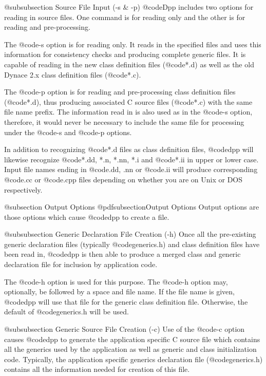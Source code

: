 @subsubsection Source File Input (-s & -p)
@code{Dpp} includes two options for reading in source files.  One
command is for reading only and the other is for reading and
pre-processing.

The @code{-s} option is for reading only.  It reads in the specified
files and uses this information for consistency checks and producing
complete generic files.  It is capable of reading in the new
class definition files (@code{*.d}) as well as the old Dynace 2.x
class definition files (@code{*.c}).

The @code{-p} option is for reading and pre-processing class
definition files (@code{*.d}), thus producing associated
C source files (@code{*.c}) with the same file name prefix.
The information read in is also used as in the @code{-s} option,
therefore, it would never be necessary to include the same
file for processing under the @code{-s} and @code{-p} options.

In addition to recognizing @code{*.d} files as class definition files,
@code{dpp} will likewise recognize @code{*.dd, *.n, *.nn, *.i} and
@code{*.ii} in upper or lower case.  Input file names ending in
@code{.dd, .nn} or @code{.ii} will produce corresponding @code{.cc} or
@code{.cpp} files depending on whether you are on Unix or DOS
respectively.

@subsection Output Options
@pdfsubsection{Output Options}
Output options are those options which cause @code{dpp} to create
a file.

@subsubsection Generic Declaration File Creation (-h)
Once all the pre-existing generic declaration files (typically
@code{generics.h}) and class definition files have been read in,
@code{dpp} is then able to produce a merged class and generic
declaration file for inclusion by application code.

The @code{-h} option is used for this purpose.  The @code{-h} option
may, optionally, be followed by a space and file name.  If the file name
is given, @code{dpp} will use that file for the generic class definition
file.  Otherwise, the default of @code{generics.h} will be used.

@subsubsection Generic Source File Creation (-c)
Use of the @code{-c} option causes @code{dpp} to generate the
application specific C source file which contains all the
generics used by the application as well as generic and class
initialization code.  Typically, the application specific
generics declaration file (@code{generics.h}) contains
all the information needed for creation of this file.

